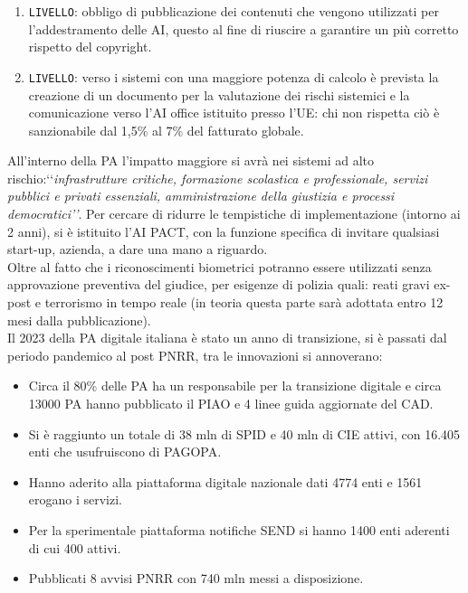 \documentclass{article}
\begin{document}
\begin{justify}
\begin{itemize}
        \begin{enumerate}
            \item \texttt{LIVELLO}: obbligo di pubblicazione dei contenuti che vengono utilizzati per \\l'addestramento delle AI, questo al fine di riuscire a garantire un più corretto rispetto del copyright.
            \item \texttt{LIVELLO}: verso i sistemi con una maggiore potenza di calcolo è prevista la creazione di un documento per la valutazione dei rischi sistemici e la comunicazione verso l'AI office istituito presso l'UE: chi non rispetta ciò è sanzionabile dal 1,5\% al 7\% del fatturato globale.\citep{La_repubblica} 
        \end{enumerate}
    \end{itemize}
    All'interno della PA l'impatto maggiore si avrà nei sistemi ad alto rischio:‘‘\textit{infrastrutture critiche, formazione scolastica e professionale, servizi pubblici e privati essenziali, amministrazione della giustizia e processi democratici’’}. Per cercare di ridurre le tempistiche di implementazione (intorno ai 2 anni), si è istituito l'AI PACT, con la funzione specifica di invitare qualsiasi start-up, azienda, a dare una mano a riguardo.\citep{marchetti_ai_2023}\\
    Oltre al fatto che i riconoscimenti biometrici potranno essere utilizzati senza approvazione preventiva del giudice, per esigenze di polizia quali: reati gravi ex-post e terrorismo in tempo reale (in teoria questa parte sarà adottata entro 12 mesi dalla pubblicazione).\\
    Il 2023 della PA digitale italiana è stato un anno di transizione, si è passati dal periodo pandemico al post PNRR, tra le innovazioni si annoverano:
    \begin{itemize}
        \item Circa il 80\% delle PA ha un responsabile per la transizione digitale e circa 13000 PA hanno pubblicato il PIAO e 4 linee guida aggiornate del CAD.
        \item Si è raggiunto un totale di 38 mln di SPID e 40 mln di CIE attivi, con 16.405 enti che usufruiscono di PAGOPA.
        \item Hanno aderito alla piattaforma digitale nazionale dati 4774 enti e 1561 erogano i servizi.
        \item Per la sperimentale piattaforma notifiche SEND si hanno 1400 enti aderenti di cui 400 attivi.
        \item Pubblicati 8 avvisi PNRR con 740 mln messi a disposizione.\citep{AttuazionePNRR}

\end{itemize}
\end{justify}
\end{document}
